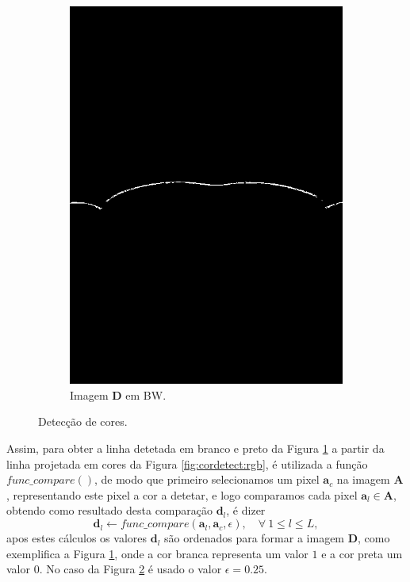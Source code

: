 \documentclass[12pt]{article}
\begin{document}
\begin{figure}[!h]
\begin{subfigure}[b]{0.4\textwidth}
         \includegraphics[width=\textwidth]{grayscale.jpg}
         \caption{Imagem $\mathbf{D}$ em BW.}
         \label{fig:cordetect:bw}
     \end{subfigure}
\caption{Detecção de cores.}
\label{fig:cordetect}
\end{figure}

Assim, para obter a linha detetada em branco e preto da Figura \ref{fig:cordetect:bw} 
a partir da linha projetada em cores da Figura \ref{fig:cordetect:rgb}, 
é utilizada a função $func\_compare()$, de modo que primeiro selecionamos um pixel $\mathbf{a}_c$ na imagem $\mathbf{A}$,
representando este pixel a cor a detetar, e logo comparamos
cada pixel $\mathbf{a}_l \in \mathbf{A}$, obtendo como resultado desta comparação $\mathbf{d}_l$, é dizer
\begin{equation}\label{eq:funccompare2}
\mathbf{d}_l\leftarrow func\_compare(\mathbf{a}_l,\mathbf{a}_c,\epsilon),\quad \forall~ 1\leq l\leq L,
\end{equation}
apos estes cálculos os valores $\mathbf{d}_l$ são ordenados para formar a imagem $\mathbf{D}$, 
como exemplifica a Figura \ref{fig:cordetect:bw}, onde a cor branca representa um 
valor $1$ e a cor preta um valor $0$.
No caso da Figura \ref{fig:cordetect} é usado o valor $\epsilon=0.25$.
\end{document}
